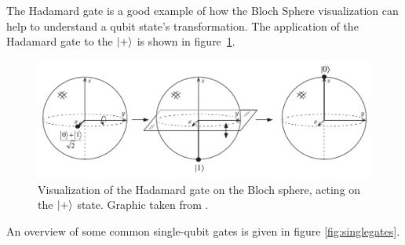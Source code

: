 The Hadamard gate is a good example of how the Bloch Sphere visualization can help to understand a qubit state's transformation. The application of the Hadamard gate to the $\Ket{+}$ is shown in figure~\ref{fig:blochH}.

\begin{figure}[H]
  \centering
  \includegraphics[width=\textwidth]{figures/hadamard}
  \caption[Hadamard Visualization]{Visualization of the Hadamard gate on the Bloch sphere, acting on the $\Ket{+}$ state. Graphic taken from \cite{nielsen2002quantum}.}
  \label{fig:blochH}
\end{figure}

An overview of some common single-qubit gates is given in figure \ref{fig:singlegates}.

